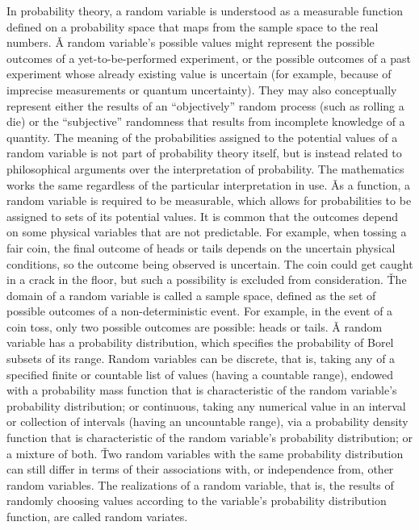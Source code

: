 In probability theory, a random variable is understood as a measurable function defined on a probability space that
maps from the sample space to the real numbers. \v

A random variable's possible values might represent the possible outcomes of a yet-to-be-performed experiment, or the
possible outcomes of a past experiment whose already existing value is uncertain (for example, because of imprecise
measurements or quantum uncertainty). They may also conceptually represent either the results of an ``objectively''
random process (such as rolling a die) or the ``subjective'' randomness that results from incomplete knowledge of a
quantity. The meaning of the probabilities assigned to the potential values of a random variable is not part of
probability theory itself, but is instead related to philosophical arguments over the interpretation of probability.
The mathematics works the same regardless of the particular interpretation in use. \v

As a function, a random variable is required to be measurable, which allows for probabilities to be assigned to sets
of its potential values. It is common that the outcomes depend on some physical variables that are not predictable.
For example, when tossing a fair coin, the final outcome of heads or tails depends on the uncertain physical
conditions, so the outcome being observed is uncertain. The coin could get caught in a crack in the floor, but such a
possibility is excluded from consideration. \v

The domain of a random variable is called a sample space, defined as the set of possible outcomes of a
non-deterministic event. For example, in the event of a coin toss, only two possible outcomes are possible: heads or
tails. \v

A random variable has a probability distribution, which specifies the probability of Borel subsets of its range.
Random variables can be discrete, that is, taking any of a specified finite or countable list of values (having a
countable range), endowed with a probability mass function that is characteristic of the random variable's
probability distribution; or continuous, taking any numerical value in an interval or collection of intervals (having
an uncountable range), via a probability density function that is characteristic of the random variable's probability
distribution; or a mixture of both. \v

Two random variables with the same probability distribution can still differ in terms of their associations with, or
independence from, other random variables. The realizations of a random variable, that is, the results of randomly
choosing values according to the variable's probability distribution function, are called random variates.

